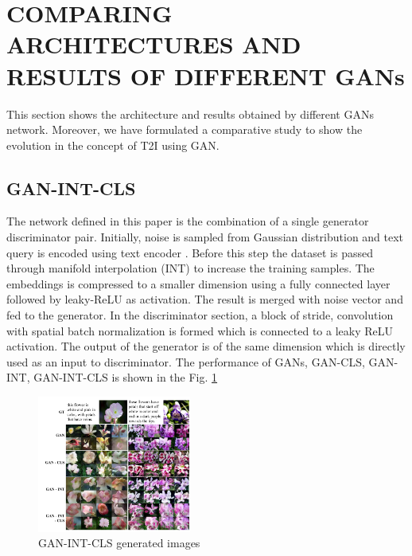 \documentclass[conference]{IEEEtran}
\begin{document}
	
	
	\section{COMPARING ARCHITECTURES AND RESULTS OF DIFFERENT GANs}
	
	This section shows the architecture and results obtained by different GANs network. Moreover, we have formulated a comparative study to show the evolution in the concept of T2I using GAN.
	
	\subsection{GAN-INT-CLS}
	The network defined in this paper is the combination of a single generator discriminator pair. Initially, noise is sampled from Gaussian distribution and text query is encoded using text encoder \cite{b7}. Before this step the dataset is passed through manifold interpolation (INT) to increase the training samples. The embeddings is compressed to a smaller dimension using a fully connected layer followed by leaky-ReLU as activation. The result is merged with noise vector and fed to the generator. In the discriminator section, a block of stride, convolution with spatial batch normalization is formed which is connected to a leaky ReLU activation. The output of the generator is of the same dimension which is directly used as an input to discriminator. The performance of GANs, GAN-CLS, GAN-INT, GAN-INT-CLS is shown in the Fig. \ref{gan_int_cls}
	
	\begin{figure}[htbp]
		\centering
		\includegraphics[width=0.45\textwidth]{GAN_cls_int.png}
		\caption{GAN-INT-CLS generated images \cite{b2}}
		\label{gan_int_cls}
	\end{figure}
	
\end{document}
